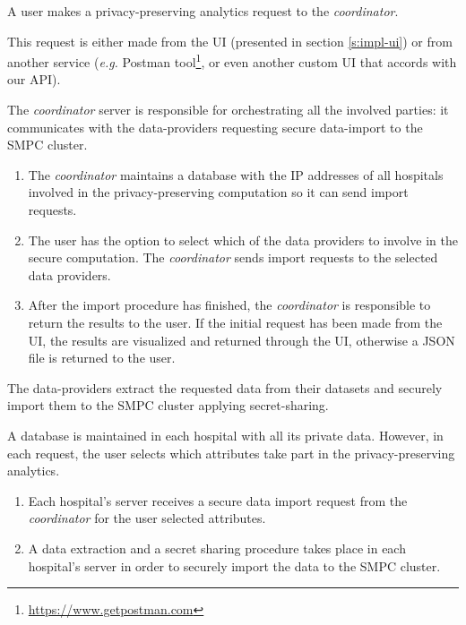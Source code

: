 \begin{description}[labelwidth=4em, leftmargin=\dimexpr\labelwidth+\labelsep\relax]
  \item [Step 1:] A user makes a privacy\hyp preserving analytics request to the \textit{coordinator}.

  This request is either made from the UI (presented in section \ref{s:impl-ui}) or from another service (\textit{e.g.} Postman tool\footnote{\href{https://www.getpostman.com}{https://www.getpostman.com}}, or even another custom UI that accords with our API).


  \item [Step 2:] The \textit{coordinator} server is responsible for orchestrating all the involved parties: it communicates with the data\hyp providers requesting secure data\hyp import to the SMPC cluster.
  \begin{enumerate}[label=\subscript{2}]
    \item The \textit{coordinator} maintains a database with the IP addresses of all hospitals involved in the privacy\hyp preserving computation so it can send import requests.
    \item The user has the option to select which of the data providers to involve in the secure computation. The \textit{coordinator} sends import requests to the selected data providers.
    \item After the import procedure has finished, the \textit{coordinator} is responsible to return the results to the user. If the initial request has been made from the UI, the results are visualized and returned through the UI, otherwise a JSON file is returned to the user.
  \end{enumerate}


  \item [Step 3:] The data\hyp providers extract the requested data from their datasets and securely import them to the SMPC cluster applying secret\hyp sharing.

  A database is maintained in each hospital with all its private data.
  However, in each request, the user selects which attributes take part in the privacy\hyp preserving analytics.

  \begin{enumerate}[label=\subscript{3}]
    \item Each hospital's server receives a secure data import request from the \textit{coordinator} for the user selected attributes.
    \item A data extraction and a secret sharing procedure takes place in each hospital's server in order to securely import the data to the SMPC cluster.
  \end{enumerate}


\end{description}
